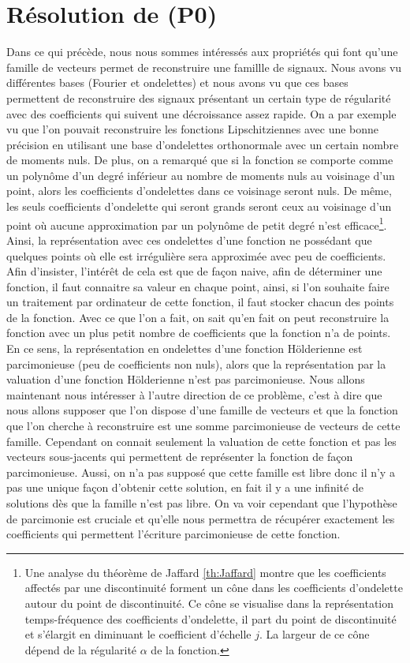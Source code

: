\section{Résolution de (P0)}
Dans ce qui précède, nous nous sommes intéressés aux propriétés qui font qu'une famille de vecteurs permet de reconstruire une famillle de signaux.
Nous avons vu différentes bases (Fourier et ondelettes) et nous avons vu que ces bases permettent de reconstruire des signaux présentant un certain type de régularité avec des coefficients qui suivent une décroissance assez rapide.
\newline
On a par exemple vu que l'on pouvait reconstruire les fonctions Lipschitziennes avec une bonne précision en utilisant une base d'ondelettes orthonormale avec un certain nombre de moments nuls.
De plus, on a remarqué que si la fonction se comporte comme un polynôme d'un degré inférieur au nombre de moments nuls au voisinage d'un point, alors les coefficients d'ondelettes dans ce voisinage seront nuls.
De même, les seuls coefficients d'ondelette qui seront grands seront ceux au voisinage d'un point où aucune approximation par un polynôme de petit degré n'est efficace\footnote{Une analyse du théorème de Jaffard \ref{th:Jaffard} montre que les coefficients affectés par une discontinuité forment un cône dans les coefficients d'ondelette autour du point de discontinuité. Ce cône se visualise dans la représentation temps-fréquence des coefficients d'ondelette, il part du point de discontinuité et s'élargit en diminuant le coefficient d'échelle $j$. La largeur de ce cône dépend de la régularité $\alpha$ de la fonction.}.
Ainsi, la représentation avec ces ondelettes d'une fonction ne possédant que quelques points où elle est irrégulière sera approximée avec peu de coefficients.
Afin d'insister, l'intérêt de cela est que de façon naive, afin de déterminer une fonction, il faut connaitre sa valeur en chaque point, ainsi, si l'on souhaite faire un traitement par ordinateur de cette fonction, il faut stocker chacun des points de la fonction.
Avec ce que l'on a fait, on sait qu'en fait on peut reconstruire la fonction avec un plus petit nombre de coefficients que la fonction n'a de points.
En ce sens, la représentation en ondelettes d'une fonction Hölderienne est parcimonieuse (peu de coefficients non nuls), alors que la représentation par la valuation d'une fonction Hölderienne n'est pas parcimonieuse.
\newline
Nous allons maintenant nous intéresser à l'autre direction de ce problème, c'est à dire que nous allons supposer que l'on dispose d'une famille de vecteurs et que la fonction que l'on cherche à reconstruire est une somme parcimonieuse de vecteurs de cette famille.
Cependant on connait seulement la valuation de cette fonction et pas les vecteurs sous-jacents qui permettent de représenter la fonction de façon parcimonieuse.
Aussi, on n'a pas supposé que cette famille est libre donc il n'y a pas une unique façon d'obtenir cette solution, en fait il y a une infinité de solutions dès que la famille n'est pas libre.
On va voir cependant que l'hypothèse de parcimonie est cruciale et qu'elle nous permettra de récupérer exactement les coefficients qui permettent l'écriture parcimonieuse de cette fonction.
